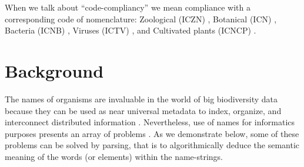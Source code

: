 \documentclass{bmcart}
\begin{document}
When we talk about ``code-compliancy'' we mean compliance with a corresponding
code of nomenclature: Zoological (ICZN) \cite{ICZN}, Botanical (ICN)
\cite{ICN}, Bacteria (ICNB) \cite{ICNB}, Viruses (ICTV) \cite{ICTV}, and Cultivated
plants (ICNCP) \cite{ICNCP}.

\section*{Background}

The names of organisms are invaluable in the world of big biodiversity data
because they can be used as near universal metadata to index, organize, and
interconnect distributed information \cite{Patterson2010}. Nevertheless, use of
names for informatics purposes presents an array of problems . As we
demonstrate below, some of these problems can be solved by parsing, that is to
algorithmically deduce the semantic meaning of the words (or elements) within
the name-strings.
\end{document}
